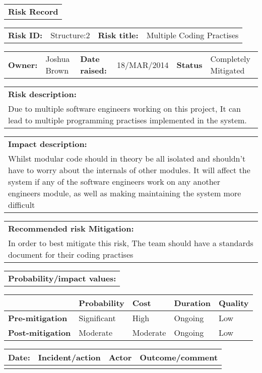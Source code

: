 \begin{table}
	\begin{tabularx}{\textwidth}{| X |}
		\hline
		\textbf{Risk Record} \\
	\end{tabularx}
	\begin{tabularx}{\textwidth}{| l | X | l | X |}
		\hline
		\textbf{Risk ID:} & Structure:2 & \textbf{Risk title:} & Multiple Coding Practises  \\
	\end{tabularx}
	\begin{tabularx}{\textwidth}{| l | X | l | X | l | X |}
		\hline
		\textbf{Owner:} & Joshua Brown & \textbf{Date raised:} & 18/MAR/2014 & \textbf{Status} & Completely Mitigated \\
	\end{tabularx}
	\begin{tabularx}{\textwidth}{| X |}
		\hline
		\textbf{Risk description:} \\ Due to multiple software engineers working on this project, It can lead to multiple programming practises implemented in the system.  \\
	\end{tabularx}
	\begin{tabularx}{\textwidth}{| X |}
		\hline
		\textbf{Impact description:} \\ Whilst modular code should in theory be all isolated and shouldn't have to worry about the internals of other modules. It will affect the system if any of the software engineers work on any another engineers module, as well as making maintaining the system more difficult \\
	\end{tabularx}
	\begin{tabularx}{\textwidth}{| X |}
		\hline
		\textbf{Recommended risk Mitigation:} \\ In order to best mitigate this risk, The team should have a standards document for their coding practises  \\
	\end{tabularx}
	\begin{tabularx}{\textwidth}{| X |}
		\hline
		\textbf{Probability/impact values:} \\
	\end{tabularx}
	\begin{tabularx}{\textwidth}{| l | l | X | X | X |}
		\hline
		 &  \textbf{Probability} & \textbf{Cost} & \textbf{Duration} & \textbf{Quality} \\ \hline
		\textbf{Pre-mitigation} & Significant & High & Ongoing & Low \\ \hline
		\textbf{Post-mitigation} & Moderate & Moderate & Ongoing & Low \\ \hline \hline
	\end{tabularx}
	\begin{tabularx}{\textwidth}{| l | X | l | X |}
		\hline
		\textbf{Date:} & \textbf{Incident/action} & \textbf{Actor} & \textbf{Outcome/comment} \\ \hline
		 &  &  &  \\ \hline
	\end{tabularx}%
\end{table}

